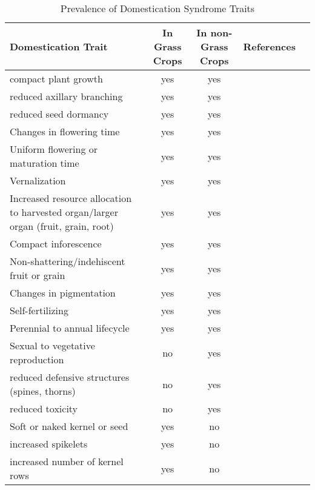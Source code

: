 \documentclass[12pt]{article}
\begin{document}
\begin{table}
\begin{center}
\caption{Prevalence of Domestication Syndrome Traits} \label{tab:DomTraits}
\begin{tabular}{p{5cm}cccl}\\\toprule  
{\bf Domestication Trait} & {\bf In Grass Crops} & {\bf In non-Grass Crops} &	{\bf References} \\\toprule
compact plant growth & yes & yes & \cite{Doebley2006}\\
reduced axillary branching & yes & yes & \cite{Doebley2006}\\
reduced seed dormancy & yes & yes & \cite{Doebley2006}\\
Changes in flowering time & yes & yes & \cite{Doebley2006}\\
Uniform flowering or maturation time & yes & yes & \cite{Doebley2006}\\
Vernalization & yes & yes & \cite{Doebley2006}\\
Increased resource allocation to harvested organ/larger organ (fruit, grain, root) & yes & yes & \cite{Doebley2006}\\
Compact inforescence & yes & yes & \cite{Doebley2006}\\
Non-shattering/indehiscent fruit or grain & yes & yes & \cite{Doebley2006}\\
Changes in pigmentation & yes & yes & \cite{Doebley2006}\\
Self-fertilizing & yes & yes & \cite{Doebley2006}\\
Perennial to annual lifecycle  & yes & yes & \cite{Doebley2006}\\
Sexual to vegetative reproduction & no & yes & \cite{Doebley2006}\\
reduced defensive structures (spines, thorns) & no & yes & \cite{Doebley2006}\\
reduced toxicity & no & yes & \cite{Doebley2006}\\
Soft or naked kernel or seed & yes & no & \cite{Doebley2006}\\
increased spikelets & yes & no & \cite{Doebley2006}\\
increased number of kernel rows & yes & no & \cite{Doebley2006}\\\bottomrule
\end{tabular}
\end{center}
\end{table} 
 
\end{document}
